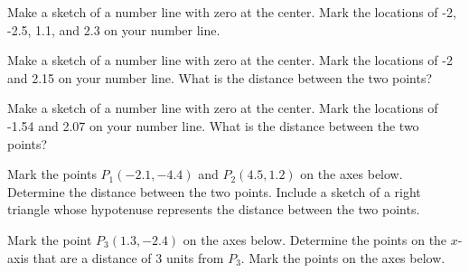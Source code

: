 
\begin{problem}
\item Make a sketch of a number line with zero at the center.  Mark
  the locations of -2, -2.5, 1.1, and 2.3 on your number line.

  \vfill

\item Make a sketch of a number line with zero at the center.  Mark
  the locations of -2 and 2.15 on your number line. What is the
  distance between the two points?

  \vfill

\item Make a sketch of a number line with zero at the center.  Mark
  the locations of -1.54 and 2.07 on your number line. What is the
  distance between the two points?

  \vfill

\end{problem}


\begin{problem}
\item Mark the points $P_1(-2.1,-4.4)$ and $P_2(4.5,1.2)$ on the axes
  below. Determine the distance between the two points.  Include a
  sketch of a right triangle whose hypotenuse represents the distance
  between the two points.

  \hspace*{-6em}
  \scalebox{0.95}{}

  \vfill

  \clearpage

\item Mark the point $P_3(1.3,-2.4)$ on the axes below. Determine the
  points on the $x$-axis that are a distance of 3 units from $P_3$.
   Mark the points on
  the axes below.

  \hspace*{-6em}
  \scalebox{0.95}{}

  \vfill
\end{problem}


\postClass

